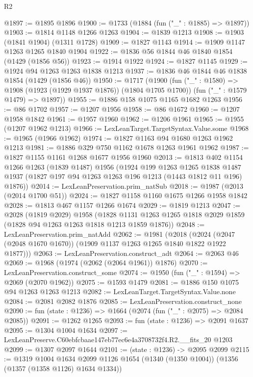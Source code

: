 \begin{lexlean}{R2}
\begin{coremodule}
@1897 := @1895 @1896
@1900 := @1733 (@1884 (fun ("_" : @1885) => @1897))
@1903 := @1814 @1148 @1266 @1263
@1904 := @1839 @1213
@1908 := @1903 (@1841 @1904) (@1311 @1728)
@1909 := @1827 @1143
@1914 := @1909 @1147 @1263 @1265 @1840 @1904
@1922 := @1836 @56 @1844 @46 @1840 @1854 (@1429 (@1856 @56))
@1923 := @1914 @1922
@1924 := @1827 @1145
@1929 := @1924 @94 @1263 @1263 @1838 @1213
@1937 := @1836 @46 @1844 @46 @1838 @1854 (@1429 (@1856 @46))
@1950 := @1717
    (@1900
      (fun ("_" : @1580) => @1908 (@1923 (@1929 @1937 @1876)) (@1804 @1705 @1700))
      (fun ("_" : @1579 @1479) => @1897))
@1955 := @1886 @158 @1075 @1165 @1682 @1263
@1956 := @86 @1702
@1957 := @1207 @1956
@1958 := @86 @1672
@1960 := @1207 @1958 @1842
@1961 := @1957 @1960
@1962 := @1206 @1961
@1965 := @1955 (@1207 @1962 @1213)
@1966 := LexLeanTarget.TargetSyntax.Value.some
@1968 := @1965 (@1966 @1962)
@1974 := @1827 @1163 @94 @1680 @1263 @1962 @1213
@1981 := @1886 @329 @750 @1162 @1678 @1263 @1961 @1962
@1987 := @1827 @1155 @1161 @1268 @1677 @1956 @1960
@2013 := @1813
    @402
    @1154
    @1266
    @1263
    (@1839 @1487)
    @1956
    (@1924
      @199
      @1263
      @1265
      @1838
      @1487
      @1937
      (@1827 @197 @94 @1263 @1263 @196 @1213 (@1443 @1812 @11 @196) @1876))
@2014 := LexLeanPreservation.prim_natSub
@2018 := @1987 (@2013 (@2014 @1700 @51))
@2024 := @1827 @1158 @1160 @1675 @1266 @1958 @1842
@2028 := @1813 @467 @1157 @1266 @1674
@2029 := @1819 @1213
@2047 := @2028
    (@1819 @2029)
    @1958
    (@1828 @1131 @1263 @1265 @1818 @2029 @1859 (@1828 @94 @1263 @1263 @1818 @1213 @1859 @1876))
@2048 := LexLeanPreservation.prim_natAdd
@2062 := @1981
    (@2018 (@2024 (@2047 (@2048 @1670 @1670)) (@1909 @1137 @1263 @1265 @1840 @1822 @1922 @1877)))
@2063 := LexLeanPreservation.construct_adt
@2064 := @2063 @46
@2069 := @1968 (@1974 (@2062 (@2064 @1961)) @1876)
@2070 := LexLeanPreservation.construct_some
@2074 := @1950 (fun ("_" : @1594) => @2069 (@2070 @1962))
@2075 := @1593 @1479
@2081 := @1886 @150 @1075 @94 @1263 @1263 @1213
@2082 := LexLeanTarget.TargetSyntax.Value.none
@2084 := @2081 @2082 @1876
@2085 := LexLeanPreservation.construct_none
@2090 := fun (state : @1236) => @1664 (@2074 (fun ("_" : @2075) => @2084 @2085))
@2091 := @1262 @1265
@2093 := fun (state : @1236) => @2091 @1637
@2095 := @1304 @1004 @1634
@2097 := LexLeanPreserve.C60ebfcbaae147eb77ec6e4a3708732f4.R2.__fits_20 @1203
@2099 := @1307 @2097 @1644
@2101 := (state : @1236) -> @2095 @2099
@2115 := @1319
    @1004
    @1634
    @2099
    @1126
    @1654
    (@1340 (@1350 @1004))
    (@1356 (@1357 (@1358 @1126) @1634 @1334))

\end{coremodule}
\end{lexlean}
